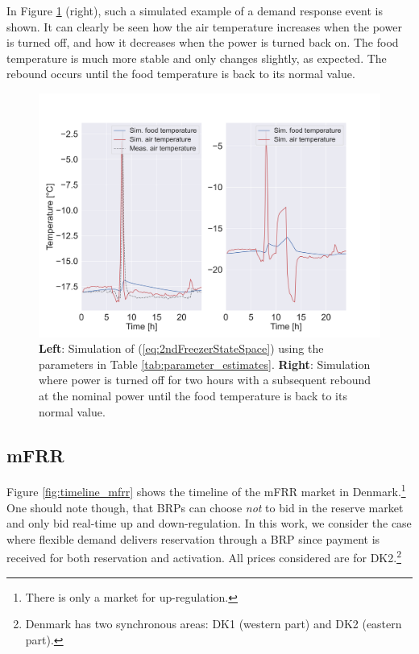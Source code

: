 In Figure \ref{fig:2ndFreezerModelSimulation} (right), such a simulated example of a demand response event is shown. It can clearly be seen how the air temperature increases when the power is turned off, and how it decreases when the power is turned back on. The food temperature is much more stable and only changes slightly, as expected. The rebound occurs until the food temperature is back to its normal value.

\begin{figure}[!t]
    \centering
    \includegraphics[width=\columnwidth]{../figures/2ndFreezerModelSimulation.png}
    \caption{ \textbf{Left}: Simulation of (\ref{eq:2ndFreezerStateSpace}) using the parameters in Table \ref{tab:parameter_estimates}. \textbf{Right}: Simulation where power is turned off for two hours with a subsequent rebound at the nominal power until the food temperature is back to its normal value.}
    \label{fig:2ndFreezerModelSimulation}
\end{figure}


\subsection{mFRR}\label{sec:mFRR}

Figure \ref{fig:timeline_mfrr} shows the timeline of the mFRR market in Denmark.\footnote{There is only a market for up-regulation.} One should note though, that BRPs can choose \textit{not} to bid in the reserve market and only bid real-time up and down-regulation. In this work, we consider the case where flexible demand delivers reservation through a BRP since payment is received for both reservation and activation. All prices considered are for DK2.\footnote{Denmark has two synchronous areas: DK1 (western part) and DK2 (eastern part).}

